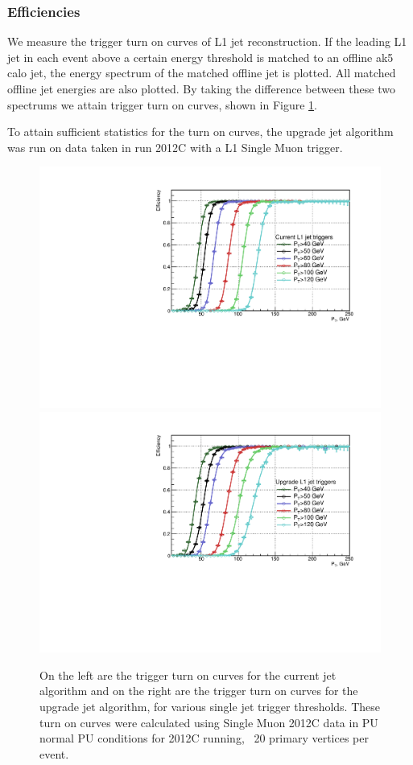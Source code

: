 \subsubsection{\sc Efficiencies}
We measure the trigger turn on curves of L1 jet reconstruction. If the leading L1 jet in each event above a certain energy threshold is matched to an offline ak5 calo jet, the energy spectrum of the matched offline jet is plotted. All matched offline jet energies are also plotted. By taking the difference between these two spectrums we attain trigger turn on curves, shown in Figure \ref{JetTO}.

To attain sufficient statistics for the turn on curves, the upgrade jet algorithm was run on data taken in run 2012C with a L1 Single Muon trigger.

\begin{figure}[t!]
\begin{center}
  \includegraphics[scale=0.37]{Figures/l1jets//CurrentL1JetTriggers.pdf}
    \includegraphics[scale=0.37]{Figures/l1jets//UpgradeL1JetTriggers.pdf}
\caption{On the left are the trigger turn on curves for the current jet algorithm and on the right are the trigger turn on curves for the upgrade jet algorithm, for various single jet trigger thresholds. These turn on curves were calculated using Single Muon 2012C data in PU normal PU conditions for 2012C running, ~20 primary vertices per event.}
\label{JetTO}
\end{center}
\end{figure}

